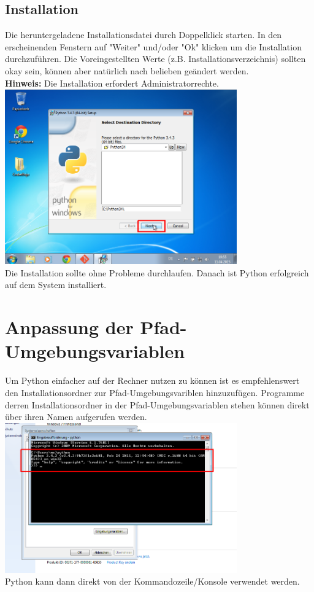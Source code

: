 \documentclass[ngerman,oneside, a4letter]{scrbook}
\begin{document}
\clearpage

\subsection{Installation}
Die heruntergeladene Installationsdatei durch Doppelklick starten. In den erscheinenden Fenstern auf "Weiter" und/oder "Ok" klicken um die Installation durchzuführen. Die Voreingestellten Werte (z.B. Installationsverzeichnis) sollten okay sein, können aber natürlich nach belieben geändert werden.
\\
\textbf{Hinweis:} Die Installation erfordert Administratorrechte.
\\


\includegraphics[width=100mm]{bilder/python_install}
\\
Die Installation sollte ohne Probleme durchlaufen. Danach ist Python erfolgreich auf dem System installiert.

\clearpage

\section{Anpassung der Pfad-Umgebungsvariablen}
Um Python einfacher auf der Rechner nutzen zu können ist es empfehlenswert den Installationsordner zur Pfad-Umgebungsvariblen hinzuzufügen. Programme derren Installationsordner in der Pfad-Umgebungsvariablen stehen können direkt über ihren Namen aufgerufen werden.
\\
\includegraphics[width=100mm]{bilder/cmd_python}
\\
Python kann dann direkt von der Kommandozeile/Konsole verwendet werden.
\end{document}
